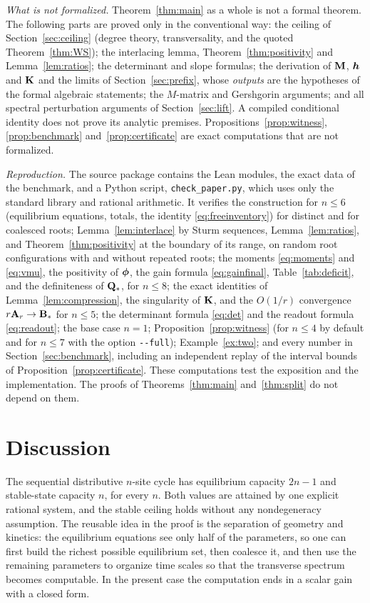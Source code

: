 \emph{What is not formalized.} Theorem~\ref{thm:main} as a whole is not a formal theorem. The
following parts are proved only in the conventional way: the ceiling of
Section~\ref{sec:ceiling} (degree theory, transversality, and the quoted
Theorem~\ref{thm:WS}); the interlacing lemma, Theorem~\ref{thm:positivity} and
Lemma~\ref{lem:ratios}; the determinant and slope formulas; the derivation of \(\mathbf M\), \(\boldsymbol h\)
and \(\mathbf K\) and the limits of Section~\ref{sec:prefix}, whose \emph{outputs} are the hypotheses
of the formal algebraic statements; the \(M\)-matrix and Gershgorin arguments; and all spectral
perturbation arguments of Section~\ref{sec:lift}. A compiled conditional identity does not
prove its analytic premises. Propositions~\ref{prop:witness}, \ref{prop:benchmark}
and~\ref{prop:certificate} are exact computations that are not formalized.

{\sloppy\emph{Reproduction.} The source package contains the Lean modules, the exact data of
the benchmark, and a Python script, \texttt{check\_paper.py}, which uses only the standard
library and rational arithmetic. It verifies the construction for \(n\le6\) (equilibrium
equations, totals, the identity \eqref{eq:freeinventory}) for distinct and for coalesced roots;
Lemma~\ref{lem:interlace} by Sturm sequences, Lemma~\ref{lem:ratios}, and
Theorem~\ref{thm:positivity} at the boundary of its range, on random root configurations with
and without repeated roots; the moments \eqref{eq:moments} and \eqref{eq:vmu}, the positivity
of \(\boldsymbol\phi\), the gain formula \eqref{eq:gainfinal}, Table~\ref{tab:deficit}, and the
definiteness of \(\mathbf Q_*\), for \(n\le8\); the exact identities of Lemma~\ref{lem:compression},
the singularity of \(\mathbf K\), and the \(O(1/r)\) convergence \(r\mathbf A_r\to\mathbf B_*\) for \(n\le5\); the
determinant formula \eqref{eq:det} and the readout formula \eqref{eq:readout}; the base case
\(n=1\); Proposition~\ref{prop:witness} (for \(n\le4\) by default and for \(n\le7\) with the
option \texttt{-{}-full}); Example~\ref{ex:two}; and every number in
Section~\ref{sec:benchmark}, including an independent replay of the interval bounds of
Proposition~\ref{prop:certificate}. These computations test the exposition and the
implementation. The proofs of Theorems~\ref{thm:main} and~\ref{thm:split} do not depend on
them.\par}

\section{Discussion}\label{sec:discussion}
The sequential distributive \(n\)-site cycle has equilibrium capacity \(2n-1\) and stable-state
capacity \(n\), for every \(n\). Both values are attained by one explicit rational system, and
the stable ceiling holds without any nondegeneracy assumption. The reusable idea in the proof
is the separation of geometry and kinetics: the equilibrium equations see only half of the
parameters, so one can first build the richest possible equilibrium set, then coalesce it, and
then use the remaining parameters to organize time scales so that the transverse spectrum
becomes computable. In the present case the computation ends in a scalar gain with a closed
form.

